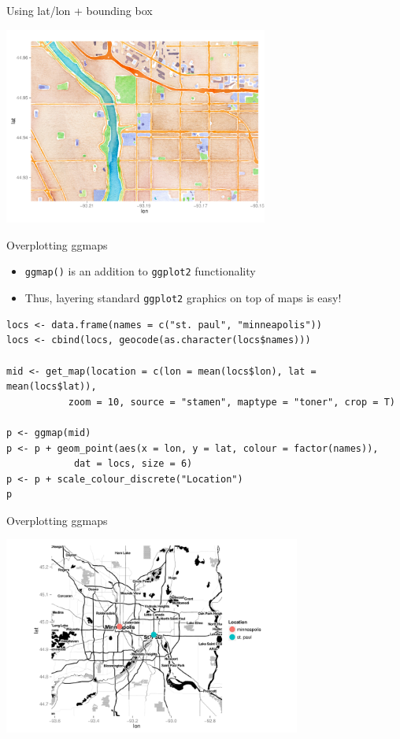 \documentclass[sans,aspectratio=169,presentation,bigger,fleqn]{beamer}
\begin{document}
\begin{frame}[label=sec-7]{Using lat/lon + bounding box}
\begin{center}
\includegraphics[height=6.5cm]{./img/ust-coords-box.pdf}
\end{center}
\end{frame}
\begin{frame}[fragile,label=sec-8]{Overplotting ggmaps}
 \begin{itemize}
\item \texttt{ggmap()} is an addition to \texttt{ggplot2} functionality
\item Thus, layering standard \texttt{ggplot2} graphics on top of maps is easy!
\end{itemize}

\scriptsize
\begin{verbatim}
locs <- data.frame(names = c("st. paul", "minneapolis"))
locs <- cbind(locs, geocode(as.character(locs$names)))

mid <- get_map(location = c(lon = mean(locs$lon), lat = mean(locs$lat)),
	       zoom = 10, source = "stamen", maptype = "toner", crop = T)

p <- ggmap(mid)
p <- p + geom_point(aes(x = lon, y = lat, colour = factor(names)),
		    dat = locs, size = 6)
p <- p + scale_colour_discrete("Location")
p
\end{verbatim}

\normalsize
\end{frame}
\begin{frame}[label=sec-9]{Overplotting ggmaps}
\begin{center}
\includegraphics[height=6.5cm]{./img/ggmap-points.pdf}
\end{center}
\end{frame}
\end{document}
